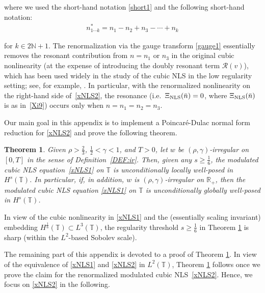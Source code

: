 \documentclass[letterpaper, 11pt,  reqno]{amsart}
\newtheorem{theorem}{Theorem} [section]
\newcommand{\1}{\hspace{0.5mm}\text{I}\hspace{0.5mm}}
\newcommand{\noi}{\noindent}
\newcommand{\R}{\mathbb{R}}
\newcommand{\T}{\mathbb{T}}
\newcommand{\RR}{\mathcal{R}}
\newcommand{\g}{\gamma}
\newcommand{\N}{\mathbb{N}}
\newcommand{\NLS}{\text{\rm NLS} }
\numberwithin{equation}{section}
\numberwithin{theorem}{section}
\begin{document}
\noi
where   we used 
 the short-hand notation \eqref{short1}
and 
the following short-hand notation:
\begin{align}
n_{1\cdots k}^* = n_1 - n_2 + n_3 -  \cdots + n_k
\label{no2}
\end{align}

\noi
for $k \in 2\N + 1$.
The renormalization via the gauge transform \eqref{gauge1}
essentially removes the resonant contribution from $n = n_1$ or $n_3$
in the original  cubic nonlinearity (at the expense
of introducing the doubly resonant term $\RR(v)$),
which has been used widely in the study of the cubic NLS
in the low regularity setting;
see, for example, \cite{BO96, Christ, GH, CO, GO, FOW, OW1, OW}.
In particular, 
 with the renormalized nonlinearity 
on the right-hand side of~\eqref{xNLS2}, 
the resonance (i.e.~$\Xi_{\NLS}(\bar n) = 0$, 
where $\Xi_{\NLS}(\bar n)$ is as in~\eqref{Xi9})
occurs only when $n = n_1 = n_2 = n_3$.






Our main goal in this appendix is to 
implement a Poincar\'e-Dulac normal form reduction for \eqref{xNLS2}
and prove the following theorem.

\begin{theorem}\label{THM:UU4}
Given $\rho > \frac 23$,  $\frac12< \g < 1$, and $T> 0$, 
let  $w$ be $(\rho,\g)$-irregular on $[0, T]$ in the sense of Definition~\ref{DEF:ir}.
Then, 
given any    $s\ge \frac 16$, 
the modulated cubic NLS equation~\eqref{xNLS1}
on  $\T$
is unconditionally locally well-posed in $H^s(\T)$.
In particular, 
if, in addition, $w$ is  $(\rho,\g)$-irregular  on $\R_+$, 
then the modulated cubic NLS equation \eqref{xNLS1}
on  $\T$
is unconditionally globally well-posed in $H^s(\T)$.

\end{theorem}


In view of  the cubic nonlinearity in \eqref{xNLS1}
and the (essentially scaling invariant) embedding $H^\frac 16 (\T)\subset L^3(\T)$, 
the regularity threshold $s \ge \frac 16$ 
in Theorem \ref{THM:UU4} 
is sharp
(within the $L^2$-based Sobolev scale). 



\medskip

The remaining part of this appendix is devoted to a proof of Theorem \ref{THM:UU4}.
In view of the equivalence of \eqref{xNLS1} and \eqref{xNLS2}
in $L^2(\T)$, 
Theorem \ref{THM:UU4} follows once we prove the claim for 
the renormalized modulated cubic NLS~\eqref{xNLS2}.
Hence, we focus on \eqref{xNLS2} in the following.
\end{document}
